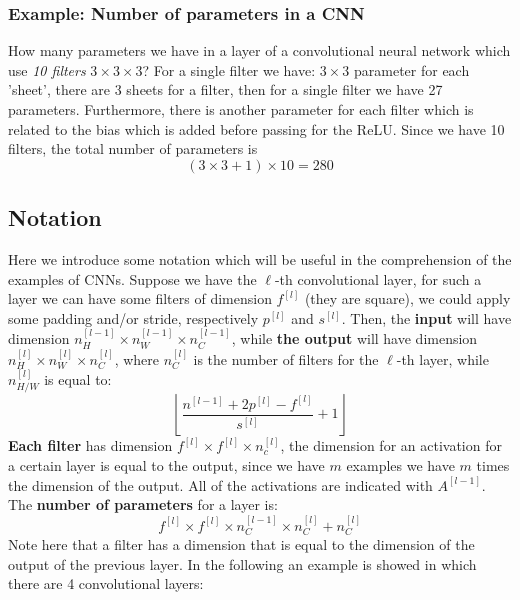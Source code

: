 \subsubsection{Example: Number of parameters in a CNN}
How many parameters we have in a layer of a convolutional neural network which use \textit{10 filters} $3\times3\times3$? For a single filter we have:  $3\times3$ parameter for each 'sheet', there are 3 sheets for a filter, then for a single filter we have 27 parameters. Furthermore, there is another parameter for each filter which is related to the bias which is added before passing for the ReLU. Since we have 10 filters, the total number of parameters is 
\begin{equation*}
    (3\times3+1)\times10=280
\end{equation*}

\subsection{Notation}
Here we introduce some notation which will be useful in the comprehension of the examples of CNNs. Suppose we have the $\ell$-th convolutional layer, for such a layer we can have some filters of dimension $f^{[l]}$ (they are square), we could apply some padding and/or stride, respectively $p^{[l]}$ and $s^{[l]}$. Then, the \textbf{input} will have dimension $n_H^{[l-1]}\times{n_W^{[l-1]}}\times{n_C^{[l-1]}}$, while \textbf{the output} will have dimension $n_H^{[l]}\times{n_W^{[l]}}\times{n_C^{[l]}}$, where $n_C^{[l]}$ is the number of filters for the $\ell$-th layer, while $n_{H/W}^{[l]}$ is equal to:
\begin{equation}
    \left\lfloor \frac{n^{[l-1]}+2p^{[l]}-f^{[l]}}{s^{[l]}}+1\right\rfloor
\end{equation}
\textbf{Each filter} has dimension $f^{[l]}\times{f^{[l]}}\times{n_c^{[l]}}$, the dimension for an activation for a certain layer is equal to the output, since we have $m$ examples we have $m$ times the dimension of the output. All of the activations are indicated with $A^{[l-1]}$. The \textbf{number of parameters} for a layer is:
\begin{equation}
    f^{[l]}\times{f^{[l]}}\times{n_C^{[l-1]}}\times{n_C^{[l]}}+n_C^{[l]}
\end{equation}
Note here that a filter has a dimension that is equal to the dimension of the output of the previous layer.
In the following an example is showed in which there are 4 convolutional layers:

